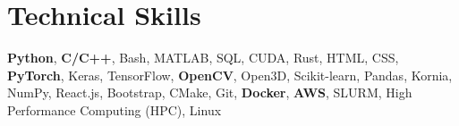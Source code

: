 \section{Technical Skills}
\vspace{4pt}
\small{
\textbf{Python}, 
\textbf{C/C++}, 
Bash, 
MATLAB, 
SQL, 
CUDA, 
Rust, 
HTML, 
CSS, 
\textbf{PyTorch}, 
Keras, 
TensorFlow, 
\textbf{OpenCV}, 
Open3D, 
Scikit-learn, 
Pandas,
Kornia,
NumPy,
React.js,
Bootstrap,
CMake, 
Git, 
\textbf{Docker},
\textbf{AWS},
SLURM,
High Performance Computing (HPC), 
Linux
}
